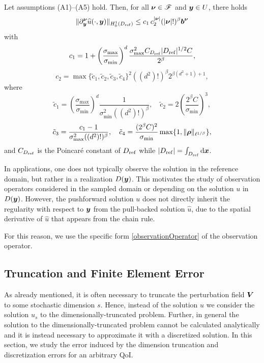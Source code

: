 \documentclass[graybox]{svmult}
\begin{document}
\begin{theorem}  Let assumptions {\rm (A1)--(A5)} hold. Then, for all ${\boldsymbol{\nu}}\in\mathscr F$ and ${\boldsymbol{y}}\in U$, there holds\label{thm: forward regularity}
$$
\| \partial_{\boldsymbol{y}}^{\boldsymbol{\nu}} \widehat{u}(\cdot,\boldsymbol{y}) \|_{H_0^1(D_{\rm{ref}})} \leq c_1 \mathop{c_2^{|\boldsymbol{\nu}|}}(\mathop{|\boldsymbol{\nu}|!})^\beta\boldsymbol{b}^{\boldsymbol{\nu}}
$$
with
\begin{equation*}
    c_1 = 1 + \left(\frac{\sigma_{\max}}{\sigma_{\min}}\right)^d \frac{\sigma_{\max}^2 C_{D_{\rm ref}}|D_{\rm ref}|^{1/2}C}{2^\beta},
\end{equation*}
\begin{equation*}
    c_2 = \max \{\tilde{c}_1, \tilde{c}_2, \tilde{c}_3, \tilde{c}_4 \}^2 ((d^2)!)^\beta 2^{\beta(d^2+1)+1},
\end{equation*}
where 
$$
\tilde{c}_1 = \left(\frac{\sigma_{\max}}{\sigma_{\min}}\right)^d \frac{1}{\sigma_{\min}^2 ((d^2)!)^\beta}, \quad \tilde{c}_2 = 2\left(\frac{2^{\beta}C}{\sigma_{\min}}\right)^3,
$$
$$
\tilde{c}_3 = \frac{c_1 - 1}{\sigma_{\max}^{2} ((d^2)!)^\beta}, \quad \tilde{c}_4 =  \frac{(2^{\beta}C)^2}{\sigma_{\min}}\max\{1, \| {\boldsymbol{\rho}} \|_{\ell^{1/\beta}}\},
$$
and $C_{D_{\rm{ref}}}$ is the Poincar\'e constant of $D_{\rm{ref}}$ while $|D_{\rm ref}|=\int_{D_{\rm ref}}{\rm d}{\boldsymbol{x}}$.
\end{theorem}

In applications, one does not typically observe the solution in the reference domain, but rather in a realization $D({\boldsymbol{y}})$. This motivates the study of observation operators considered in the sampled domain or depending on the solution $u$ in $D({\boldsymbol{y}})$. However, 
the pushforward solution $u$ does not directly inherit the regularity with respect to ${\boldsymbol{y}}$ from the pull-backed solution $\widehat{u}$, due to the spatial derivative of $\widehat{u}$ that appears from the chain rule.

For this reason, we use the specific form \eqref{observationOperator} of the observation operator.

\subsection{Truncation and Finite Element Error}

As already mentioned,  it is often necessary to truncate the perturbation field ${\boldsymbol{V}}$ to some stochastic dimension $s$. Hence, instead of the solution $u$ we consider the solution $u_s$ to the dimensionally-truncated problem. Further, in general the solution to the dimensionally-truncated problem cannot be calculated analytically and it is instead necessary to approximate it with a discretized solution. In this section, we study the error induced by the dimension truncation and discretization errors for an arbitrary QoI.
\end{document}

